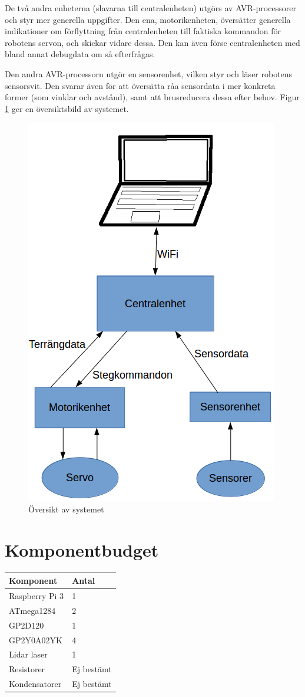 \documentclass[a4paper,titlepage,12pt]{article}
\begin{document}
	De två andra enheterna (slavarna till centralenheten) utgörs av AVR-processorer och styr 
	mer generella uppgifter. Den ena, motorikenheten, översätter generella indikationer om 
	förflyttning från centralenheten till faktiska kommandon för robotens servon, och skickar 
	vidare dessa. Den kan även förse centralenheten med bland annat debugdata om så efterfrågas.
	
	Den andra AVR-processorn utgör en sensorenhet, vilken styr och läser robotens sensorsvit. 
	Den svarar även för att översätta råa sensordata i mer konkreta former (som vinklar och 
	avstånd), samt att brusreducera dessa efter behov. Figur \ref{fig:overview} ger en översiktsbild av
	systemet.
	\begin{figure}[h]
		\centering
		\includegraphics[width=0.5\linewidth]{../images/overview.png}
		\caption{Översikt av systemet\label{fig:overview}}
	\end{figure}
	
	\section{Komponentbudget}
	\begin{longtable}[c]{l l}
		\textbf{Komponent} & \textbf{Antal} \\ \midrule
		Raspberry Pi 3 & 1 \\
		ATmega1284 & 2 \\
		GP2D120 & 1 \\
		GP2Y0A02YK & 4 \\
		Lidar laser & 1 \\
		Resistorer & Ej bestämt \\
		Kondensatorer & Ej bestämt \\
		
	\end{longtable}
\end{document}
